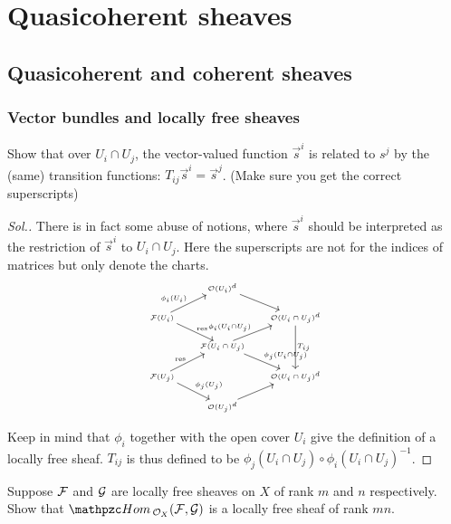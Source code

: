 \documentclass[11pt]{book} %
\begin{document}
\part{Quasicoherent sheaves}
\chapter{Quasicoherent and coherent sheaves}
\section{Vector bundles and locally free sheaves}
\begin{exr}
Show that over $U_i\cap U_j$, the vector-valued function $\vec{s}^i$ is related to ${s}^j$ by the (same) transition functions: $T_{ij} \vec{s}^{i}=\vec{s}^j$. (Make sure you get the correct superscripts)
\end{exr}
\begin{proof}[Sol.]
There is in fact some abuse of notions, where $\vec{s}^i$ should be interpreted as the restriction of $\vec{s}^i$ to $U_i\cap U_j$.
Here the superscripts are not for the indices of matrices but only denote the  charts.
$$
\tiny
\begin{tikzcd}
 & \calo(U_i)^d \arrow[rd] &  \\
\calf(U_i) \arrow[ru, "\phi_i(U_i)"] \arrow[rd, "\res"] &  & \calo(U_i\cap U_j)^d \arrow[dd, "T_{ij}"] \\
 & \calf(U_i\cap U_j) \arrow[rd, "\phi_j(U_i\cap U_j)"] \arrow[ru, "\phi_i(U_i\cap U_j)"] &  \\
\calf(U_j) \arrow[ru, "\res"] \arrow[rd, "\phi_j(U_j)"] &  & \calo(U_i\cap U_j)^d \\
 & \calo(U_j)^d \arrow[ru] & 
\end{tikzcd}
$$

Keep in mind that $\phi_i$ together with the open cover $U_i$ give the definition of a locally free sheaf. $T_{ij}$ is thus defined to be $\phi_j(U_i\cap U_j)\circ\phi_i(U_i\cap U_j)^{-1}$. 
\end{proof}
\begin{exr}
Suppose ${\cal F}$ and ${\cal G}$ are locally free sheaves on $X$ of rank $m$ and $n$ respectively. Show that $\phom_{\calo_X}(\calf , \calg)$ is a locally free sheaf of rank $mn$.
\end{exr}
\end{document}
